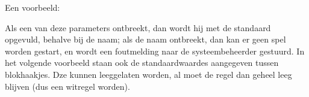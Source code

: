 \documentclass[12pt]{article}
\begin{document}
    Een voorbeeld:
    
    \begin{center}
    \end{center}
    
    Als een van deze parameters ontbreekt, dan wordt hij met de standaard opgevuld, behalve bij de naam; als de naam ontbreekt, dan kan er geen spel worden gestart, en wordt een foutmelding naar de systeembeheerder gestuurd. In het volgende voorbeeld staan ook de standaardwaardes aangegeven tussen blokhaakjes. Dze kunnen leeggelaten worden, al moet de regel dan geheel leeg blijven (dus een witregel worden).
    
    \begin{center}
    \end{center}
    
\end{document}
